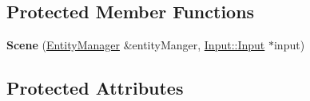 \subsection*{Protected Member Functions}
\begin{DoxyCompactItemize}
\item 
{\bfseries Scene} (\hyperlink{class_ensum_1_1_components_1_1_entity_manager}{Entity\+Manager} \&entity\+Manger, \hyperlink{class_ensum_1_1_input_1_1_input}{Input\+::\+Input} $\ast$input)\hypertarget{class_ensum_1_1_components_1_1_scene_aee190492d4435b67533941958ff81a8e}{}\label{class_ensum_1_1_components_1_1_scene_aee190492d4435b67533941958ff81a8e}

\end{DoxyCompactItemize}
\subsection*{Protected Attributes}
